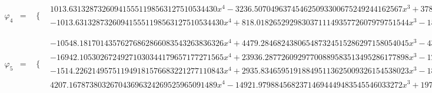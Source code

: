 \documentclass{article}
\begin{document}
\begin{landscape}
\begin{eqnarray*}
\begin{array}{cc}
\end{array}\\
\varphi_4 & = & \begin{array}{cc}
 \{ & 
\begin{array}{cc}
 1013.631328732609415551198563127510534430 x^4-3236.507049637454625093300675249244162567 x^3+3783.334476980046546640657794831190635089 x^2-1911.673119978166880206207816424690920198 x+351.2143639029655431076521337152339132456 & x\geq \frac{1}{2}\land x<1 \\
 -1013.631328732609415551198563127510534430 x^4+818.0182652929830371114935772607979751544 x^3-155.6013004633391646679471478485213539696 x^2 & x\geq 0\land x<\frac{1}{2}
\end{array}

\end{array}\\
\varphi_5 & = & \begin{array}{cc}
 \{ & 
\begin{array}{cc}
 -10548.18170143576276862866083543263836326 x^4+4479.284682438065487324515286297158054045 x^3-435.0163383417875770819507765542585964510 x^2 & x\geq 0\land x<\frac{1}{4} \\
 -16942.10530267249271030344179657177271565 x^4+23936.28772609297700889583513495286177898 x^3-12138.66758444033130148758240618604046614 x^2+2603.257777441271573262867153264142383442 x-198.3756499689359267302495709698448561433 & x\geq \frac{1}{4}\land x<\frac{1}{2} \\
 -1514.226214957511949181576683221277110843 x^4+2935.834659519188495113625009326154538023 x^3-1825.002500925546615887024126376898772152 x^2+325.9929499993378924380339109997833177674 x+22.65468321287200893468717632898168301653 & x\geq \frac{1}{2}\land x<\frac{3}{4} \\
 4207.167873803267043696324269525965091489 x^4-14921.97988456823714694449483545546033272 x^3+19737.13888303381815389814065304016318943 x^2-11537.00960757599304174809387781780574667 x+2514.682735307144991098123790707137798466 & x\geq \frac{3}{4}\land x<1
\end{array}


\end{array}
\end{eqnarray*}
\end{landscape}
\end{document}
